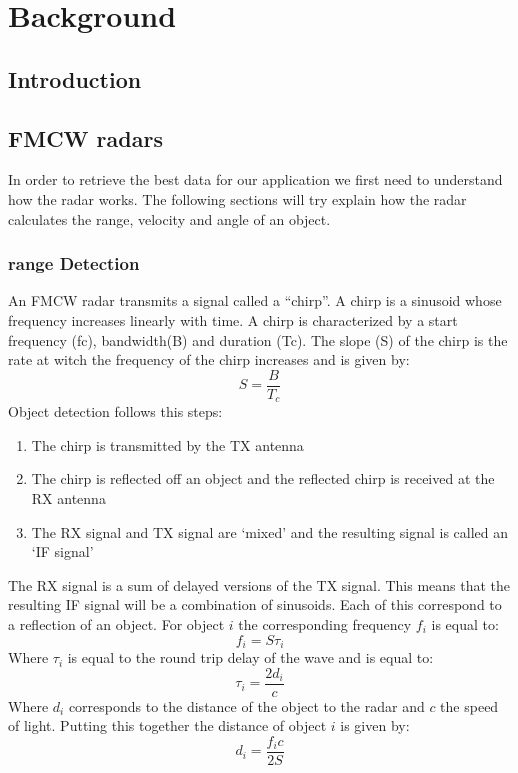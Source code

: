 \chapter{Background} \label{ch:Concepts}

\section{Introduction}
\section {FMCW radars}
In order to retrieve the best data for our application we first need to understand how the radar works. The following sections will try explain how the radar calculates the range, velocity and angle of an object.
\subsection{range Detection}
An FMCW radar transmits a signal called a “chirp”. A chirp is a sinusoid whose frequency  increases linearly with time.
A chirp is characterized by a start frequency (fc), bandwidth(B) and duration (Tc). The slope (S) of the chirp is the rate at witch the frequency of the chirp increases and is given by:
\begin{equation}
    S=\frac{B}{T_c}
\end{equation}
Object detection follows this steps:
\begin{enumerate}
    \item The chirp is transmitted by the TX antenna
    \item The chirp is reflected off an object and the reflected chirp is received at the RX antenna
    \item The RX signal and TX signal are ‘mixed’ and the resulting signal is called an ‘IF signal’
\end{enumerate}


The RX signal is a sum of delayed versions of the TX signal. This means that the resulting IF signal will be a combination of sinusoids. Each of this correspond to a reflection of an object. For object $i$ the corresponding frequency $f_i$ is equal to:
\begin{equation}
    f_i=S\tau_i
\end{equation}
Where $\tau_i$ is equal to the round trip delay of the wave and is equal to:
\begin{equation}
    \tau_i=\frac{2d_i}{c}
\end{equation}
Where $d_i$ corresponds to the distance of the object to the radar and $c$ the speed of light.
Putting this together the distance of object $i$ is given by:
\begin{equation}
    d_i=\frac{f_ic}{2S}
\end{equation}
